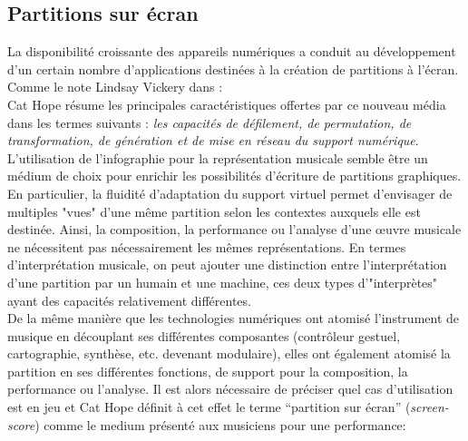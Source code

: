 \subsection{Partitions sur écran}

\noindent La disponibilité croissante des appareils numériques a conduit au développement d'un certain nombre d'applications destinées à la création de partitions à l'écran. Comme le note Lindsay Vickery dans \cite{vickery_limitations_2014} : \\
\indent Cat Hope résume les principales caractéristiques offertes par ce nouveau média dans les termes suivants \cite{hope_screen_2011}: \textit{les capacités de défilement, de permutation, de transformation, de génération et de mise en réseau du support numérique}.\\
\indent L'utilisation de l'infographie pour la représentation musicale semble être un médium de choix pour enrichir les possibilités d'écriture de partitions graphiques. En particulier, la fluidité d'adaptation du support virtuel permet d'envisager de multiples "vues" d'une même partition selon les contextes auxquels elle est destinée. Ainsi, la composition, la performance ou l'analyse d'une œuvre musicale ne nécessitent pas nécessairement les mêmes représentations. En termes d'interprétation musicale, on peut ajouter une distinction entre l'interprétation d'une partition par un humain et une machine, ces deux types d'"interprètes" ayant des capacités relativement différentes.\\
\indent De la même manière que les technologies numériques ont atomisé l'instrument de musique en découplant ses différentes composantes (contrôleur gestuel, cartographie, synthèse, etc. devenant modulaire), elles ont également atomisé la partition en ses différentes fonctions, de support pour la composition, la performance ou l'analyse. Il est alors nécessaire de préciser quel cas d'utilisation est en jeu et Cat Hope définit à cet effet le terme ``partition sur écran'' (\textit{screen-score}) \cite{hope_screen_2011} comme le medium présenté aux musiciens pour une performance: \\
